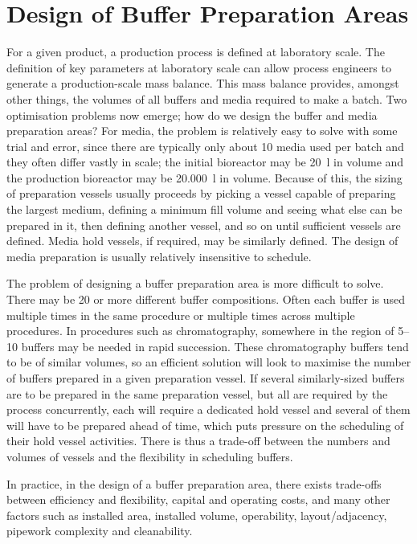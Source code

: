 \section{Design of Buffer Preparation Areas}\label{SS.buffprepdes}

For a given product, a production process is defined at laboratory scale.
The definition of key parameters at laboratory scale can allow process
engineers to generate a production-scale mass balance.
This mass balance provides, amongst other things, the volumes of all buffers
and media required to make a batch.
Two optimisation problems now emerge; how do we design the buffer and media
preparation areas?
For media, the problem is relatively easy to solve with some trial and error,
since there are typically only about 10 media used per batch and they often
differ vastly in scale; the initial bioreactor may be \SI{20}{\litre} in volume
and the production bioreactor may be \SI{20,000}{\litre} in volume.
Because of this, the sizing of preparation vessels usually proceeds by picking
a vessel capable of preparing the largest medium, defining a minimum fill
volume and seeing what else can be prepared in it, then defining another
vessel, and so on until sufficient vessels are defined.
Media hold vessels, if required, may be similarly defined.
The design of media preparation is usually relatively insensitive to schedule.

The problem of designing a buffer preparation area is more difficult to solve.
There may be 20 or more different buffer compositions.
Often each buffer is used multiple times in the same procedure or multiple
times across multiple procedures.
In procedures such as chromatography, somewhere in the region of 
\numrange[range-phrase=--]{5}{10} buffers may be needed in rapid succession.
These chromatography buffers tend to be of similar volumes, so an efficient
solution will look to maximise the number of buffers prepared in a given
preparation vessel.
If several similarly-sized buffers are to be prepared in the same preparation
vessel, but all are required by the process concurrently, each will require a
dedicated hold vessel and several of them will have to be prepared ahead of
time, which puts pressure on the scheduling of their hold vessel activities.
There is thus a trade-off between the numbers and volumes of vessels and
the flexibility in scheduling buffers.

In practice, in the design of a buffer preparation area, there exists
trade-offs between efficiency and flexibility, capital and operating costs,
and many other factors such as installed area, installed volume, operability,
layout/adjacency, pipework complexity and cleanability.

